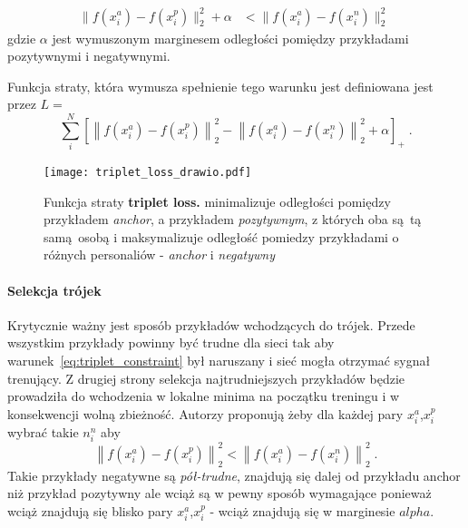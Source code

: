 \begin{align}\label{eq:triplet_constraint}
  \|f(x_i^a) - f(x_i^p)\|_2^2 + \alpha &< \|f(x_i^a) - f(x_i^n)\|_2^2\;
\end{align}
gdzie $\alpha$ jest wymuszonym marginesem odległości pomiędzy przykładami pozytywnymi i negatywnymi.

Funkcja straty, która wymusza spełnienie tego warunku jest definiowana jest przez $L=$
\begin{equation}\label{eq:triplet_loss}
  \sum_i^N\left[\left\|f(x_i^a)-f(x_i^p)\right\|_2^2 -
                  \left\|f(x_i^a)-f(x_i^n)\right\|_2^2+\alpha\right]_+\;.
\end{equation}


\begin{figure}[h]
    \centering
    \texttt{[image: triplet\_loss\_drawio.pdf]}
    \caption{Funkcja straty \textbf{triplet loss.} minimalizuje odległości pomiędzy przykładem \emph{anchor}, a przykładem \emph{pozytywnym}, z których oba są tą samą osobą i maksymalizuje odległość pomiedzy przykładami o różnych personaliów - \emph{anchor} i \emph{negatywny}}
    \label{fig:triplet_loss}
\end{figure}


\paragraph{Selekcja trójek}
 Krytycznie ważny jest sposób przykładów wchodzących do trójek. Przede wszystkim przykłady
 powinny być trudne dla sieci tak aby warunek~\ref{eq:triplet_constraint} był naruszany i sieć
 mogła otrzymać sygnał trenujący. Z drugiej strony selekcja najtrudniejszych przykładów będzie
 prowadziła do wchodzenia w lokalne minima na początku treningu i w konsekwencji wolną zbieżność.
 Autorzy proponują żeby dla każdej pary \(x_i^a\),\(x_i^p\) wybrać takie \(n_i^n\) aby
 \begin{equation}\label{eq:semi_hard}
  \left\|f(x_i^a)-f(x_i^p)\right\|_2^2<\left\|f(x_i^a)-f(x_i^n)\right\|_2^2\;.
 \end{equation}
 Takie przykłady negatywne są \emph{pół-trudne}, znajdują się dalej od przykładu anchor niż przykład pozytywny ale wciąż są w pewny sposób wymagające ponieważ wciąż znajdują się blisko pary \(x_i^a\),\(x_i^p\) - wciąż znajdują się w marginesie \(alpha\).

